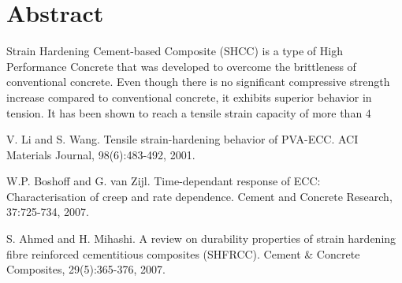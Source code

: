 \documentclass[article,A4,11pt]{llncs}%
\begin{document}
\section*{Abstract}
Strain Hardening Cement-based Composite (SHCC) is a type of High Performance Concrete that was developed to overcome the brittleness of conventional concrete. Even though there is no significant compressive strength increase compared to conventional concrete, it exhibits superior behavior in tension. It has been shown to reach a tensile strain capacity of more than 4%


\begin{thebibliography}{10}
{\sc V. Li and S. Wang}. {Tensile strain-hardening behavior of PVA-ECC}. ACI Materials Journal, 98(6):483-492, 2001.

{\sc W.P. Boshoff and G. van Zijl}. {Time-dependant response of ECC: Characterisation of creep and rate dependence}. Cement and Concrete Research, 37:725-734, 2007.

{\sc S. Ahmed and H. Mihashi}. {A review on durability properties of strain hardening fibre reinforced cementitious composites (SHFRCC)}. Cement \& Concrete Composites, 29(5):365-376, 2007.
\end{thebibliography}
\end{document}
